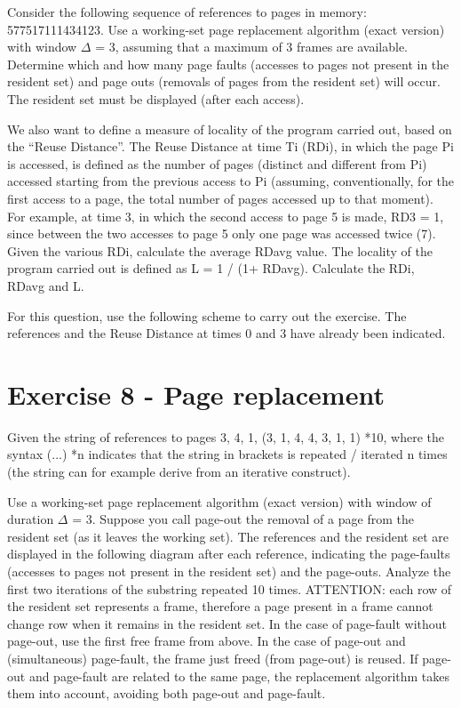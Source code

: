 Consider the following sequence of references to pages in memory: 577517111434123.
Use a working-set page replacement algorithm (exact version) with window $\Delta$ = 3, assuming that a maximum of 3 frames are available. Determine which and how many page faults (accesses to pages not present in the resident set) and page outs (removals of pages from the resident set) will occur. The resident set must be displayed (after each access).

We also want to define a measure of locality of the program carried out, based on the “Reuse Distance”. The Reuse Distance at time Ti (RDi), in which the page Pi is accessed, is defined as the number of pages (distinct and different from Pi) accessed starting from the previous access to Pi (assuming, conventionally, for the first access to a page, the total number of pages accessed up to that moment). For example, at time 3, in which the second access to page 5 is made, RD3 = 1, since between the two accesses to page 5 only one page was accessed twice (7). Given the various RDi, calculate the average RDavg value. The locality of the program carried out is defined as L = 1 / (1+ RDavg). Calculate the RDi, RDavg and L. 

For this question, use the following scheme to carry out the exercise. The references and the Reuse Distance at times 0 and 3 have already been indicated.


\section{Exercise 8 - Page replacement}

Given the string of references to pages 3, 4, 1, (3, 1, 4, 4, 3, 1, 1) *10, where the syntax (...) *n indicates that the string in brackets is repeated / iterated n times (the string can for example derive from an iterative construct).

Use a working-set page replacement algorithm (exact version) with window of duration $\Delta$ = 3. Suppose you call page-out the removal of a page from the resident set (as it leaves the working set). The references and the resident set are displayed in the following diagram after each reference, indicating the page-faults (accesses to pages not present in the resident set) and the page-outs. Analyze the first two iterations of the substring repeated 10 times. ATTENTION: each row of the resident set represents a frame, therefore a page present in a frame cannot change row when it remains in the resident set. In the case of page-fault without page-out, use the first free frame from above. In the case of page-out and (simultaneous) page-fault, the frame just freed (from page-out) is reused. If page-out and page-fault are related to the same page, the replacement algorithm takes them into account, avoiding both page-out and page-fault.



